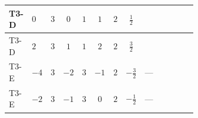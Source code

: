 \documentclass[8pt]{article}
\begin{document}
\begin{landscape}
\begin{longtable}{@{}llcccccc >{\raggedright\arraybackslash}p{0.21\linewidth} >{\raggedright\arraybackslash}p{0.21\linewidth} >{\raggedright\arraybackslash}p{0.21\linewidth}@{}}
\midrule
T3-D & $0$ & $3$ & $0$ & $1$ & $1$ & $2$ & $\frac{1}{2}$ & \scriptsize\adjustbox{max width=\linewidth}{$\begin{gathered} +\frac{1}{4} (3 \left({y_1}\,\left({y_1}\right)^{\dagger}\,{Y_e}\right)_{ij}+2 \left({y_2}\,\left({y_2}\right)^{\dagger}\,{Y_e}\right)_{ij}+6 \left({Y_e}\,\left({Y_e}\right)^{\dagger}\,{Y_e}\right)_{ij})\end{gathered}$} & \scriptsize\adjustbox{max width=\linewidth}{$\begin{gathered} -\frac{9}{4} {g_2}^2 \left({Y_e}\right)_{ij}\end{gathered}$} & \scriptsize\adjustbox{max width=\linewidth}{$\begin{gathered} -\frac{15}{4} {g_1}^2 \left({Y_e}\right)_{ij}\end{gathered}$} \\
\midrule
T3-D & $2$ & $3$ & $1$ & $1$ & $2$ & $2$ & $\frac{3}{2}$ & \scriptsize\adjustbox{max width=\linewidth}{$\begin{gathered} +\frac{1}{4} (3 \left({y_1}\,\left({y_1}\right)^{\dagger}\,{Y_e}\right)_{ij}+2 \left({y_2}\,\left({y_2}\right)^{\dagger}\,{Y_e}\right)_{ij}+6 \left({Y_e}\,\left({Y_e}\right)^{\dagger}\,{Y_e}\right)_{ij})\end{gathered}$} & \scriptsize\adjustbox{max width=\linewidth}{$\begin{gathered} -\frac{9}{4} {g_2}^2 \left({Y_e}\right)_{ij}\end{gathered}$} & \scriptsize\adjustbox{max width=\linewidth}{$\begin{gathered} -\frac{15}{4} {g_1}^2 \left({Y_e}\right)_{ij}\end{gathered}$} \\
\midrule
T3-E & $-4$ & $3$ & $-2$ & $3$ & $-1$ & $2$ & $-\frac{3}{2}$ & --- & \scriptsize\adjustbox{max width=\linewidth}{$\begin{gathered} -\frac{9}{4} {g_2}^2 \left({Y_e}\right)_{ij}\end{gathered}$} & \scriptsize\adjustbox{max width=\linewidth}{$\begin{gathered} -\frac{15}{4} {g_1}^2 \left({Y_e}\right)_{ij}\end{gathered}$} \\
\midrule
T3-E & $-2$ & $3$ & $-1$ & $3$ & $0$ & $2$ & $-\frac{1}{2}$ & --- & \scriptsize\adjustbox{max width=\linewidth}{$\begin{gathered} -\frac{9}{4} {g_2}^2 \left({Y_e}\right)_{ij}\end{gathered}$} & \scriptsize\adjustbox{max width=\linewidth}{$\begin{gathered} -\frac{15}{4} {g_1}^2 \left({Y_e}\right)_{ij}\end{gathered}$} \\

\end{longtable}
\end{landscape}
\end{document}
